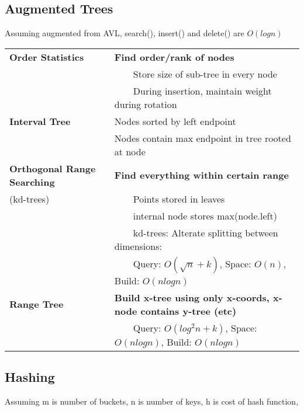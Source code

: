 \documentclass{article}
\newcommand{\tabitem}{~~\llap{\textbullet}~~}
\begin{document}
    \subsection{Augmented Trees}

    Assuming augmented from AVL, search(), insert() and delete() are $O(logn)$\\

    \noindent\begin{tabular}{|l|l|}
        \toprule
        \textbf{Order Statistics} & \textbf{Find order/rank of nodes}\\
        & \tabitem Store size of sub-tree in every node\\
        & \tabitem During insertion, maintain weight during rotation\\
        \midrule
        \textbf{Interval Tree} & Nodes sorted by left endpoint\\
        & Nodes contain max endpoint in tree rooted at node\\
        \midrule 
        \textbf{Orthogonal Range Searching} & \textbf{Find everything within certain range}\\
        (kd-trees) & \tabitem Points stored in leaves\\
        & \tabitem internal node stores max(node.left)\\
        & \tabitem kd-trees: Alterate splitting between dimensions:\\
        & \tabitem Query: $O(\sqrt{n} + k)$, Space: $O(n)$, Build: $O(nlogn)$\\
        \midrule
        \textbf{Range Tree} & \textbf{Build x-tree using only x-coords, x-node contains y-tree (etc)}\\
        & \tabitem Query: $O(log^{2}n + k)$, Space: $O(nlogn)$, Build: $O(nlogn)$\\
        \bottomrule 
    \end{tabular}

    \subsection{Hashing}

    Assuming m is number of buckets, n is number of keys, h is cost of hash function,\\
\end{document}
